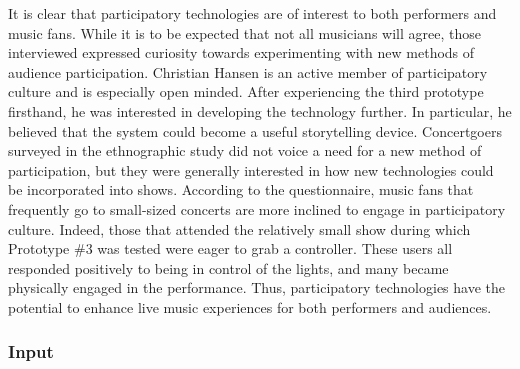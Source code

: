 It is clear that participatory technologies are of interest to both performers and music fans. While it is to be expected that not all musicians will agree, those interviewed expressed curiosity towards experimenting with new methods of audience participation. Christian Hansen is an active member of participatory culture and is especially open minded. After experiencing the third prototype firsthand, he was interested in developing the technology further. In particular, he believed that the system could become a useful storytelling device. Concertgoers surveyed in the ethnographic study did not voice a need for a new method of participation, but they were generally interested in how new technologies could be incorporated into shows. According to the questionnaire, music fans that frequently go to small-sized concerts are more inclined to engage in participatory culture. Indeed, those that attended the relatively small show during which Prototype \#3 was tested were eager to grab a controller. These users all responded positively to being in control of the lights, and many became physically engaged in the performance. Thus, participatory technologies have the potential to enhance live music experiences for both performers and audiences.

\subsubsection{Input}

